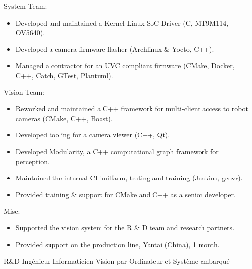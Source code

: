 \documentclass{article}
\begin{document}
\begin{llist}
{System Team:
\vspace{-0.33cm}
\begin{itemize}
	\item Developed and maintained a Kernel Linux SoC Driver (C, MT9M114, OV5640).
	\item Developed a camera firmware flasher (Archlinux \& Yocto, C++).
	\item Managed a contractor for an UVC compliant firmware (CMake, Docker, C++, Catch, GTest, Plantuml).
\end{itemize}
Vision Team:
\vspace{-0.33cm}
\begin{itemize}
	\item Reworked and maintained a C++ framework for multi-client access to robot cameras (CMake, C++, Boost).
	\item Developed tooling for a camera viewer (C++, Qt).
	\item Developed Modularity, a C++ computational graph framework for perception.
	\item Maintained the internal CI builfarm, testing and training (Jenkins,
		gcovr).
	\item Provided training \& support for CMake and C++ as a senior developer.
\end{itemize}
Misc:
\vspace{-0.33cm}
\begin{itemize}
	\item Supported the vision system for the R \& D team and research partners.
	\item Provided support on the production line, Yantai (China), 1 month.
\end{itemize}
} {
R\&D Ing\'{e}nieur Informaticien Vision par Ordinateur et Syst\`{e}me embarqu\'{e}
\vspace{-0.33cm}

}
\end{llist}
\end{document}
